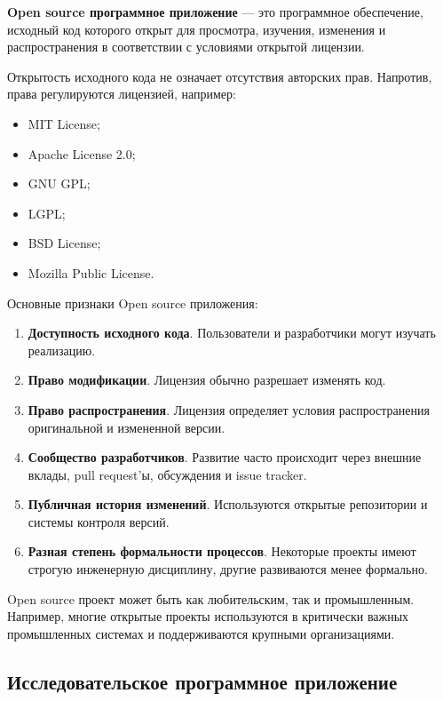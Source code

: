 \documentclass[12pt,a4paper]{article}
\begin{document}
\textbf{Open source программное приложение} --- это программное обеспечение, исходный код которого открыт для просмотра, изучения, изменения и распространения в соответствии с условиями открытой лицензии.

Открытость исходного кода не означает отсутствия авторских прав. Напротив, права регулируются лицензией, например:

\begin{itemize}
    \item MIT License;
    \item Apache License 2.0;
    \item GNU GPL;
    \item LGPL;
    \item BSD License;
    \item Mozilla Public License.
\end{itemize}

Основные признаки Open source приложения:

\begin{enumerate}
    \item \textbf{Доступность исходного кода}. Пользователи и разработчики могут изучать реализацию.

    \item \textbf{Право модификации}. Лицензия обычно разрешает изменять код.

    \item \textbf{Право распространения}. Лицензия определяет условия распространения оригинальной и измененной версии.

    \item \textbf{Сообщество разработчиков}. Развитие часто происходит через внешние вклады, pull request'ы, обсуждения и issue tracker.

    \item \textbf{Публичная история изменений}. Используются открытые репозитории и системы контроля версий.

    \item \textbf{Разная степень формальности процессов}. Некоторые проекты имеют строгую инженерную дисциплину, другие развиваются менее формально.
\end{enumerate}

Open source проект может быть как любительским, так и промышленным. Например, многие открытые проекты используются в критически важных промышленных системах и поддерживаются крупными организациями.

\subsection{Исследовательское программное приложение}
\end{document}

